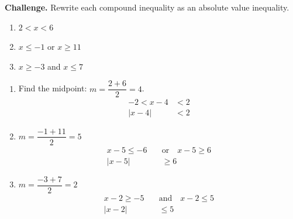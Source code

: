 \documentclass{ximera}
\begin{document}
\begin{problem}
\textbf{Challenge.} Rewrite each compound inequality as an absolute value inequality.
\begin{enumerate}
  \item[(a)] $2 < x < 6$
  \medskip
  \item[(b)] $x \leq -1$ or $x \geq 11$
  \medskip
  \item[(c)] $x \geq -3$ and $x \leq 7$
\end{enumerate}

\begin{solution}
\begin{enumerate}
  \item[(a)] Find the midpoint: $m = \dfrac{2+6}{2} = 4$.
  \begin{align*}
    -2 < x-4 &< 2\\
    |x-4| &< 2
  \end{align*}

  \item[(b)] $m = \dfrac{-1+11}{2} = 5$
  \begin{align*}
    x-5 \leq -6 \quad &\text{or}\quad x-5 \geq 6\\
    |x-5| &\geq 6
  \end{align*}

  \item[(c)] $m = \dfrac{-3+7}{2} = 2$
  \begin{align*}
    x-2 \geq -5 \quad &\text{and}\quad x-2 \leq 5\\
    |x-2| &\leq 5
  \end{align*}
\end{enumerate}
\end{solution}
\end{problem}
\end{document}
